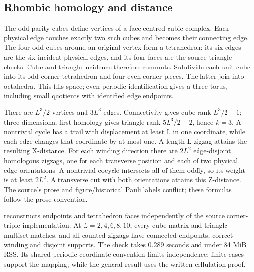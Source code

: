 \subsection{Rhombic homology and distance}
The odd-parity cubes define vertices of a face-centred cubic complex. Each physical edge touches exactly two such cubes and becomes their connecting edge. The four odd cubes around an original vertex form a tetrahedron: its six edges are the six incident physical edges, and its four faces are the source triangle checks. Cube and triangle incidence therefore commute. Subdivide each unit cube into its odd-corner tetrahedron and four even-corner pieces. The latter join into octahedra. This fills space; even periodic identification gives a three-torus, including small quotients with identified edge endpoints.

There are $L^3/2$ vertices and $3L^3$ edges. Connectivity gives cube rank $L^3/2-1$; three-dimensional first homology gives triangle rank $5L^3/2-2$, hence $k=3$. A nontrivial cycle has a trail with displacement at least L in one coordinate, while each edge changes that coordinate by at most one. A length-L zigzag attains the resulting X-distance. For each winding direction there are $2L^2$ edge-disjoint homologous zigzags, one for each transverse position and each of two physical edge orientations. A nontrivial cocycle intersects all of them oddly, so its weight is at least $2L^2$. A transverse cut with both orientations attains this Z-distance. The source's prose and figure/historical Pauli labels conflict; these formulas follow the prose convention.

 reconstructs endpoints and tetrahedron faces independently of the source corner-triple implementation. At $L=2,4,6,8,10$, every cube matrix and triangle multiset matches, and all counted zigzags have connected endpoints, correct winding and disjoint supports. The check takes 0.289 seconds and under 84 MiB RSS. Its shared periodic-coordinate convention limits independence; finite cases support the mapping, while the general result uses the written cellulation proof.

